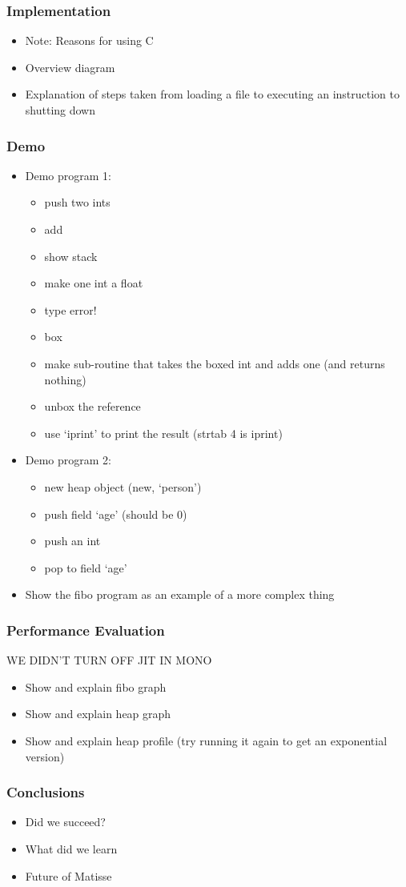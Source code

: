 \documentclass[handout]{beamer}
\begin{document}
\begin{frame}
  \frametitle{Implementation}

  \begin{itemize}
  \item Note: Reasons for using C
  \item Overview diagram
  \item Explanation of steps taken from loading a file to executing an
    instruction to shutting down
  \end{itemize}
\end{frame}

\begin{frame}
  \frametitle{Demo}

  \begin{itemize}
  \item Demo program 1:
    \begin{itemize}
    \item push two ints
    \item add
    \item show stack
    \item make one int a float
    \item type error!
    \item box
    \item make sub-routine that takes the boxed int and adds one (and returns nothing)
    \item unbox the reference
    \item use `iprint' to print the result (strtab 4 is iprint)
    \end{itemize}

  \item Demo program 2:
    \begin{itemize}
    \item new heap object (new, `person')
    \item push field `age' (should be 0)
    \item push an int
    \item pop to field `age'
    \end{itemize}

  \item Show the fibo program as an example of a more complex thing
  \end{itemize}
\end{frame}

\begin{frame}
  \frametitle{Performance Evaluation}

  WE DIDN'T TURN OFF JIT IN MONO

  \begin{itemize}
    \item Show and explain fibo graph
    \item Show and explain heap graph
    \item Show and explain heap profile (try running it again to get an exponential version)
  \end{itemize}
\end{frame}

\begin{frame}
  \frametitle{Conclusions}

  \begin{itemize}
  \item Did we succeed?
  \item What did we learn
  \item Future of Matisse
  \end{itemize}
\end{frame}
\end{document}
